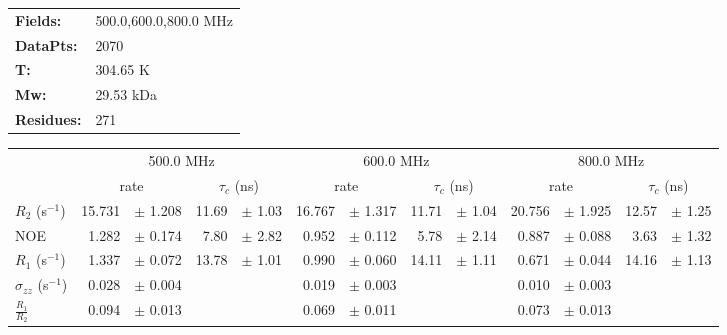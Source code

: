 \documentclass[showkeys,aps,prb,prepreint,amssymb, amsmath,nobibnotes]{article}
\begin{document}
\begin{tabular}{ll}
\textbf{Fields:} &  500.0,600.0,800.0 MHz\\
\textbf{DataPts:} &  2070\\
 \textbf{T:} & 304.65 K\\
\textbf{Mw:} & 29.53 kDa\\
\textbf{Residues: } &   271\\
\end{tabular}

\begin{small}
\noindent \begin{tabular}{l|rlrl|rlrl|rlrl}
& \multicolumn{4}{c}{500.0 MHz}& \multicolumn{4}{c}{600.0 MHz}& \multicolumn{4}{c}{800.0 MHz}\\
&  \multicolumn{2}{c}{rate} & \multicolumn{2}{c}{$\tau_c$ (ns)}   &  \multicolumn{2}{c}{rate} & \multicolumn{2}{c}{$\tau_c$ (ns)}   &  \multicolumn{2}{c}{rate} & \multicolumn{2}{c}{$\tau_c$ (ns)}   \\
\hline$R_2$  (s$^{-1}$)  &  15.731 & $\pm$ 1.208   &  11.69 & $\pm$ 1.03 &  16.767 & $\pm$ 1.317   &  11.71 & $\pm$ 1.04 &  20.756 & $\pm$ 1.925   &  12.57 & $\pm$ 1.25 \\
NOE  &  1.282 & $\pm$ 0.174   &  7.80 & $\pm$ 2.82 &  0.952 & $\pm$ 0.112   &  5.78 & $\pm$ 2.14 &  0.887 & $\pm$ 0.088   &  3.63 & $\pm$ 1.32 \\
$R_1$ (s$^{-1}$)  &  1.337 & $\pm$ 0.072   &  13.78 & $\pm$ 1.01 &  0.990 & $\pm$ 0.060   &  14.11 & $\pm$ 1.11 &  0.671 & $\pm$ 0.044   &  14.16 & $\pm$ 1.13 \\
$\sigma_{zz}$  (s$^{-1}$)  &  0.028 & $\pm$ 0.004   & & &  0.019 & $\pm$ 0.003   & & &  0.010 & $\pm$ 0.003   & & \\
$\frac{R_1}{R_2}$  &  0.094 & $\pm$ 0.013   & & &  0.069 & $\pm$ 0.011   & & &  0.073 & $\pm$ 0.013   & & \\
\end{tabular}
\end{small}
\end{document}
